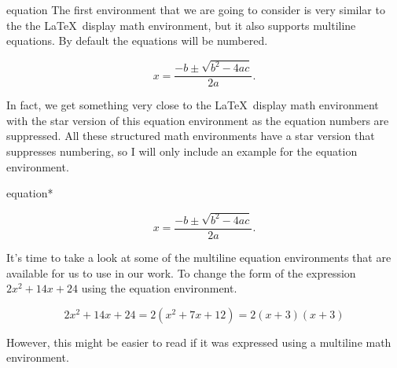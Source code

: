 \begin{docEnvironment*}[doclang/environment content=mathematics content goes here]{equation}{}{}
  The first environment that we are going to consider is very similar to the the \LaTeX ~display 
  math environment, but it also supports multiline equations.  By default the equations will 
  be numbered.
  \begin{dispExample}
    \begin{equation}
      x = \frac{-b \pm \sqrt{b^2 - 4ac}}{2a}.
    \end{equation}
    \end{dispExample}
\end{docEnvironment*}
In fact, we get something very close to the \LaTeX ~display math environment with 
the star version of this equation environment as the equation numbers are suppressed.
All these structured math environments have a star version that suppresses numbering,
so I will only include an example for the equation environment.
\begin{docEnvironment*}[doclang/environment content=mathematics content goes here]{equation*}{}{}
  \begin{dispExample}
    \begin{equation*}
      x = \frac{-b \pm \sqrt{b^2 - 4ac}}{2a}.
    \end{equation*}
    \end{dispExample}
  \end{docEnvironment*}
It's time to take a look at some of the multiline equation environments that are available
for us to use in our work. To change the form of the expression \( 2x^2 + 14x + 24 \) using 
the equation environment. 
\begin{dispExample}
  \begin{equation*}
    2x^2 + 14x + 24 = 2( x^2 + 7x + 12 ) = 2(x + 3)(x + 3)
    \end{equation*}
  \end{dispExample}

However, this might be easier to read if it was expressed using a multiline math environment.

